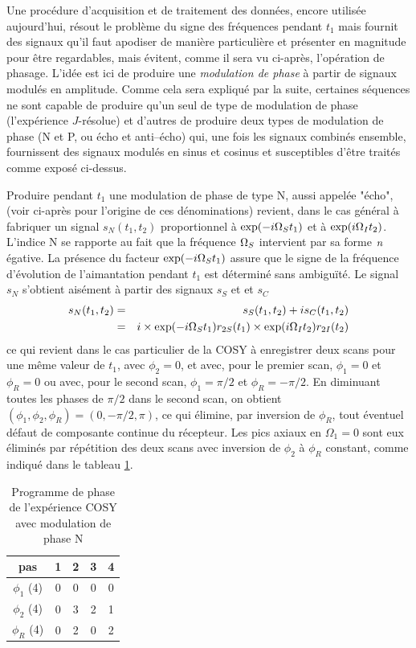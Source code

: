 Une procédure d'acquisition et de traitement des données, encore utilisée aujourd'hui,
résout le problème du signe des fréquences pendant $t_1$ mais fournit des signaux
qu'il faut apodiser de manière particulière et présenter en magnitude pour être regardables,
mais évitent, comme il sera vu ci-après, l'opération de phasage.
L'idée est ici de produire une \emph{modulation de phase} à partir de signaux
modulés en amplitude. 
Comme cela sera expliqué par la suite, certaines séquences ne sont capable de produire
qu'un seul de type de modulation de phase (l'expérience $J$-résolue)
et d'autres de produire deux types de modulation
de phase (N et P, ou écho et anti--écho) qui, une fois les signaux combinés ensemble,
fournissent des signaux modulés en sinus et cosinus et susceptibles d'être traités comme
exposé ci-dessus.

Produire pendant $t_1$ une modulation de phase de type N, aussi appelée "écho",
(voir ci-après pour l'origine de ces dénominations) revient, dans
le cas général à fabriquer un signal
$s_N(t_1, t_2)$ proportionnel à $\exp(-i \Omega_S t_1)$ et à $\exp(i \Omega_I t_2)$.
L'indice N se rapporte au fait que la fréquence $\Omega_S$ intervient par
sa forme $\emph{n}$égative.
La présence du facteur $\exp(-i \Omega_S t_1)$ assure que le signe de la
fréquence d'évolution de l'aimantation pendant $t_1$ est déterminé
sans ambiguïté.
Le signal $s_N$ s'obtient aisément à partir des signaux $s_S$ et et $s_C$
\begin{eqnarray}
s_N(t_1, t_2) & = & s_S(t_1, t_2) + i s_C(t_1, t_2) \\
              & = & i \times \exp(-i \Omega_S t_1) r_{2S}(t_1) \times \exp(i \Omega_I t_2) r_{2I}(t_2)
\end{eqnarray}
ce qui revient dans le cas particulier de la COSY à enregistrer
deux scans pour une même valeur de $t_1$, avec $\phi_2 = 0$,
et avec, pour le premier scan, $\phi_1 = 0$ et $\phi_R = 0$ 
ou avec, pour le second scan, $\phi_1 = \pi/2$ et $\phi_R = -\pi/2$.
En diminuant toutes les phases de $\pi/2$ dans le second scan, on obtient
$(\phi_1, \phi_2, \phi_R) = (0, -\pi/2, \pi) $, ce qui élimine,
par inversion de $\phi_R$, tout éventuel défaut de composante continue du récepteur.
Les pics axiaux en $\Omega_1 = 0$ sont eux éliminés par répétition
des deux scans avec inversion de $\phi_2$ à $\phi_R$
constant, comme indiqué dans le tableau \ref{tab:cosyqfn}.

\renewcommand{\baselinestretch}{1}
\normalsize
\begin{table}[hbt]
\begin{center}
\begin{tabular}{ccccc}
pas          &  1 &  2 &  3 &  4 \\
\hline
$\phi_1$ (4) &  0 &  0 &  0 &  0 \\
$\phi_2$ (4) &  0 &  3 &  2 &  1 \\
$\phi_R$ (4) &  0 &  2 &  0 &  2 \\
\hline
\end{tabular}
\caption{\label{tab:cosyqfn}
Programme de phase de l'expérience COSY avec modulation de phase N}
\end{center}
\end{table}
\renewcommand{\baselinestretch}{1.5}
\normalsize

